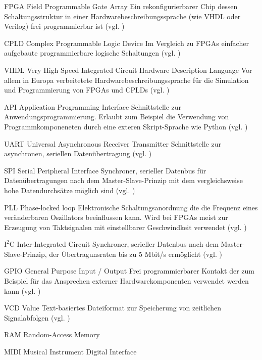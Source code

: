 
	{FPGA}
	{Field Programmable Gate Array}
	{Ein rekonfigurierbarer Chip dessen Schaltungsstruktur in einer Hardwarebeschreibungssprache (wie VHDL oder Verilog) frei programmierbar ist (vgl. \cite{wiki:FPGA})} 

	{CPLD}
	{Complex Programmable Logic Device}
	{Im Vergleich zu FPGAs einfacher aufgebaute programmierbare logische Schaltungen (vgl. \cite{wiki:CPLD})}

	{VHDL}
	{Very High Speed Integrated Circuit Hardware Description Language}
	{Vor allem in Europa verbeitetete Hardwarebeschreibungssprache für die Simulation und Programmierung von FPGAs und CPLDs (vgl. \cite{wiki:VHDL})}


	{API}
	{Application Programming Interface}
	{Schnittstelle zur Anwendungsprogrammierung. Erlaubt zum Beispiel die Verwendung von Programmkomponeneten durch eine exteren Skript-Sprache wie Python (vgl. \cite{wiki:API})}

	{UART}
	{Universal Asynchronous Receiver Transmitter}
	{Schnittstelle zur asynchronen, seriellen Datenübertragung (vgl. \cite{wiki:UART})}


	{SPI}
	{Serial Peripheral Interface}
	{Synchroner, serieller Datenbus für Datenübertragungen nach dem Master-Slave-Prinzip mit dem vergleichsweise hohe Datendurchsätze möglich sind (vgl. \cite{wiki:SPI})}


	{PLL}
	{Phase-locked loop}
	{Elektronische Schaltungsanordnung die die Frequenz eines veränderbaren Oszillators beeinflussen kann. Wird bei FPGAs meist zur Erzeugung von Taktsignalen mit einstellbarer Geschwindkeit verwendet (vgl. \cite{wiki:PLL})}

	{$\text{I}^2$C}
	{Inter-Integrated Circuit}
	{Synchroner, serieller Datenbus nach dem Master-Slave-Prinzip, der Übertragunsraten bis zu 5 Mbit/s ermöglicht (vgl. \cite{wiki:I2C})}

	{GPIO}
	{General Purpose Input / Output}
	{Frei programmierbarer Kontakt der zum Beispiel für das Ansprechen externer Hardwarekomponenten verwendet werden kann (vgl. \cite{wiki:GPIO})}


	{VCD}
	{Value}
	{Text-basiertes Dateiformat zur Speicherung von zeitlichen Signalabfolgen  (vgl. \cite{wiki:VCD})}


	{RAM}
	{Random-Access Memory} 

	{MIDI}
	{Musical Instrument Digital Interface} 

